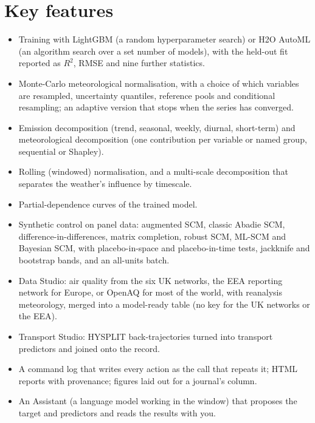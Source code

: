 \documentclass[11pt]{report}
\newcommand{\nosep}{\setlength{\itemsep}{0pt}\setlength{\parskip}{0pt}\setlength{\topsep}{2pt}}
\begin{document}
\section{Key features}
\begin{itemize}\nosep
  \item Training with LightGBM (a random hyperparameter search) or H2O AutoML (an
        algorithm search over a set number of models), with the held-out fit reported
        as $R^2$, RMSE and nine further statistics.
  \item Monte-Carlo meteorological normalisation, with a choice of which variables
        are resampled, uncertainty quantiles, reference pools and conditional
        resampling; an adaptive version that stops when the series has converged.
  \item Emission decomposition (trend, seasonal, weekly, diurnal, short-term) and
        meteorological decomposition (one contribution per variable or named group,
        sequential or Shapley).
  \item Rolling (windowed) normalisation, and a multi-scale decomposition that
        separates the weather's influence by timescale.
  \item Partial-dependence curves of the trained model.
  \item Synthetic control on panel data: augmented SCM, classic Abadie SCM,
        difference-in-differences, matrix completion, robust SCM, ML-SCM and Bayesian
        SCM, with placebo-in-space and placebo-in-time tests, jackknife and bootstrap
        bands, and an all-units batch.
  \item Data Studio: air quality from the six UK networks, the EEA reporting network
        for Europe, or OpenAQ for most of the world, with reanalysis meteorology,
        merged into a model-ready table (no key for the UK networks or the EEA).
  \item Transport Studio: HYSPLIT back-trajectories turned into transport predictors
        and joined onto the record.
  \item A command log that writes every action as the call that repeats it; HTML
        reports with provenance; figures laid out for a journal's column.
  \item An Assistant (a language model working in the window) that proposes the
        target and predictors and reads the results with you.
\end{itemize}
\end{document}
